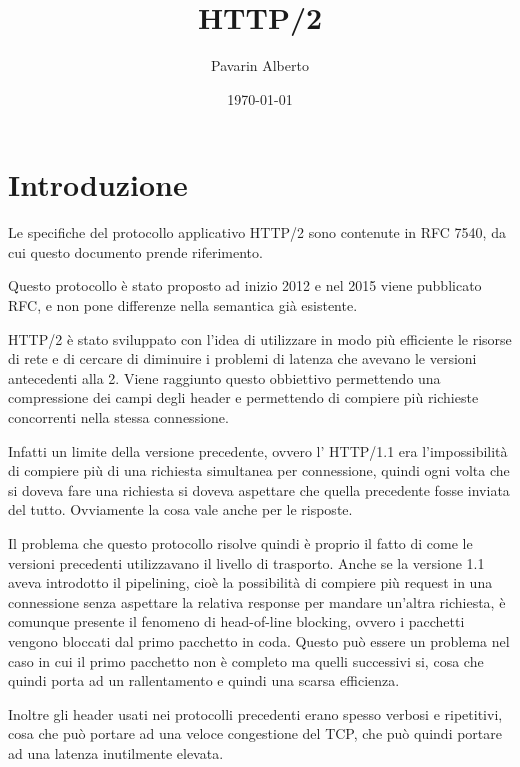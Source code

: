\documentclass[12pt, a4paper]{article} %
\title{HTTP/2}
\author{Pavarin Alberto}
\date{\today}
\begin{document}

\tableofcontents %
\newpage         %

\maketitle %

\section{Introduzione}
Le specifiche del protocollo applicativo HTTP/2 sono contenute in RFC 7540, da cui questo documento prende riferimento.

Questo protocollo è stato proposto ad inizio 2012 e nel 2015 viene pubblicato RFC, e non pone differenze nella semantica già esistente.

HTTP/2 è stato sviluppato con l'idea di utilizzare in modo più efficiente le risorse di rete e di cercare di diminuire i problemi di latenza che avevano le versioni antecedenti alla 2.
Viene raggiunto questo obbiettivo permettendo una compressione dei campi degli header e permettendo di compiere più richieste concorrenti nella stessa connessione.

Infatti un limite della versione precedente, ovvero l' HTTP/1.1 era l'impossibilità di compiere più di una richiesta simultanea per connessione, quindi ogni volta che si doveva fare una richiesta si doveva aspettare che quella precedente fosse inviata del tutto. Ovviamente la cosa vale anche per le risposte.

Il problema che questo protocollo risolve quindi è proprio il fatto di come le versioni precedenti utilizzavano il livello di trasporto.
Anche se la versione 1.1 aveva introdotto il pipelining, cioè la possibilità di compiere più request in una connessione senza aspettare la relativa response per mandare un'altra richiesta, è comunque presente il fenomeno di head-of-line blocking, ovvero i pacchetti vengono bloccati dal primo pacchetto in coda.
Questo può essere un problema nel caso in cui il primo pacchetto non è completo ma quelli successivi si, cosa che quindi porta ad un rallentamento e quindi una scarsa efficienza.

Inoltre gli header usati nei protocolli precedenti erano spesso verbosi e ripetitivi, cosa che può portare ad una veloce congestione del TCP, che può quindi portare ad una latenza inutilmente elevata.
\end{document}
